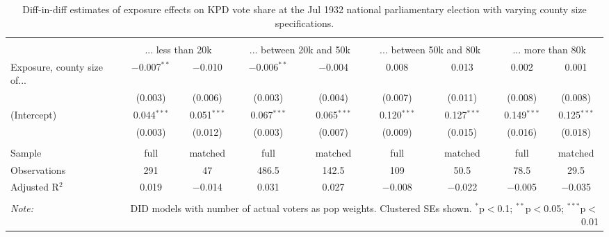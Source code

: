 
\begin{table}[!htbp] \centering 
  \caption{Diff-in-diff estimates of exposure effects on KPD vote share at the Jul 1932 national parliamentary election with varying county size specifications.\vspace{-.25cm}} 
  \label{tab:nsdap-voteshare-kpd-countysize-dd-1932-1} 
\scriptsize 
\begin{tabular}{@{\extracolsep{5pt}}lcccccccc} 
\\[-1.8ex]\hline 
\hline \\[-1.8ex] 
 & \multicolumn{2}{c}{... less than 20k } & \multicolumn{2}{c}{... between 20k and 50k} & \multicolumn{2}{c}{... between 50k and 80k} & \multicolumn{2}{c}{... more than 80k} \\ 
 \cmidrule(r){2-3}\cmidrule(r){4-5}\cmidrule(r){6-7}\cmidrule(r){8-9}Exposure, county size of... & $-$0.007$^{**}$ & $-$0.010 & $-$0.006$^{**}$ & $-$0.004 & 0.008 & 0.013 & 0.002 & 0.001 \\ 
  & (0.003) & (0.006) & (0.003) & (0.004) & (0.007) & (0.011) & (0.008) & (0.008) \\ 
  (Intercept) & 0.044$^{***}$ & 0.051$^{***}$ & 0.067$^{***}$ & 0.065$^{***}$ & 0.120$^{***}$ & 0.127$^{***}$ & 0.149$^{***}$ & 0.125$^{***}$ \\ 
  & (0.003) & (0.012) & (0.003) & (0.007) & (0.009) & (0.015) & (0.016) & (0.018) \\ 
 \hline \\[-1.8ex] 
Sample & full & matched & full & matched & full & matched & full & matched \\ 
Observations & 291 & 47 & 486.5 & 142.5 & 109 & 50.5 & 78.5 & 29.5 \\ 
Adjusted R$^{2}$ & 0.019 & $-$0.014 & 0.031 & 0.027 & $-$0.008 & $-$0.022 & $-$0.005 & $-$0.035 \\ 
\hline 
\hline \\[-1.8ex] 
\textit{Note:}  & \multicolumn{8}{r}{DID models with number of actual voters as pop weights. Clustered SEs shown. $^{*}$p$<$0.1; $^{**}$p$<$0.05; $^{***}$p$<$0.01} \\ 
\end{tabular} 
\end{table} 
